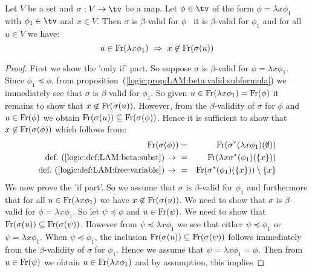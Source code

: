 \begin{prop}\label{logic:prop:LAM:beta:valid:recursion:lam}
    Let $V$ be a set and $\sigma:V\to\tv$ be a map. Let $\phi\in\tv$ 
    of the form $\phi=\lambda x\phi_{1}$ with $\phi_{1}\in\tv$ and $x\in V$. 
    Then $\sigma$ is $\beta$-valid for $\phi$ \ifand\ it is $\beta$-valid 
    for $\phi_{1}$ and for all $u\in V$ we have:
    \[
        u\in\free(\lambda x\phi_{1})\ \Rightarrow\ x\not\in\free(\sigma(u))
    \]
\end{prop}
\begin{proof}
    First we show the 'only if' part. So suppose $\sigma$ is $\beta$-valid
    for $\phi=\lambda x\phi_{1}$. Since $\phi_{1}\preceq\phi$, from
    proposition~(\ref{logic:prop:LAM:beta:valid:subformula}) we immediately
    see that $\sigma$ is $\beta$-valid for $\phi_{1}$. So given
    $u\in\mbox{\rm Fr}(\lambda x \phi_{1})=\mbox{\rm Fr}(\phi)$ it remains to show that
    $x\not\in\mbox{\rm Fr}(\sigma(u))$. However, from the $\beta$-validity of 
    $\sigma$ for $\phi$ and $u\in\mbox{\rm Fr}(\phi)$ we obtain
    $\mbox{\rm Fr}(\sigma(u))\subseteq\mbox{\rm Fr}(\sigma(\phi))$. Hence it is sufficient
    to show that $x\not\in\mbox{\rm Fr}(\sigma(\phi))$ which follows from:
    \begin{eqnarray*}
        \mbox{\rm Fr}(\sigma(\phi))
        &=&\mbox{\rm Fr}(\sigma^{*}(\lambda x\phi_{1})(\emptyset))\\
        \mbox{def.~(\ref{logic:def:LAM:beta:subst})$\ \rightarrow\ $}
        &=&\mbox{\rm Fr}(\lambda x \sigma^{*}(\phi_{1})(\{x\}))\\
        \mbox{def.~(\ref{logic:def:LAM:free:variable})$\ \rightarrow\ $}
        &=&\mbox{\rm Fr}(\sigma^{*}(\phi_{1})(\{x\}))\setminus\{x\}
    \end{eqnarray*}
    We now prove the 'if part'. So we assume that $\sigma$ is $\beta$-valid
    for $\phi_{1}$ and furthermore that for all $u\in\mbox{\rm Fr}(\lambda x\phi_{1})$
    we have $x\not\in\mbox{\rm Fr}(\sigma(u))$. We need to show that $\sigma$ is 
    $\beta$-valid for $\phi=\lambda x\phi_{1}$. So let $\psi\preceq\phi$ and 
    $u\in\mbox{\rm Fr}(\psi)$. We need to show that 
    $\mbox{\rm Fr}(\sigma(u))\subseteq\mbox{\rm Fr}(\sigma(\psi))$. However from 
    $\psi\preceq\lambda x\phi_{1}$ we see that either $\psi\preceq\phi_{1}$
    or $\psi=\lambda x\phi_{1}$. When $\psi\preceq\phi_{1}$, the inclusion
    $\mbox{\rm Fr}(\sigma(u))\subseteq\mbox{\rm Fr}(\sigma(\psi))$ follows immediately
    from the $\beta$-validity of $\sigma$ for $\phi_{1}$. Hence we assume 
    that $\psi=\lambda x\phi_{1}=\phi$. Then from $u\in\mbox{\rm Fr}(\psi)$ we
    obtain $u\in\mbox{\rm Fr}(\lambda x\phi_{1})$ and by assumption, this implies

\end{proof}
